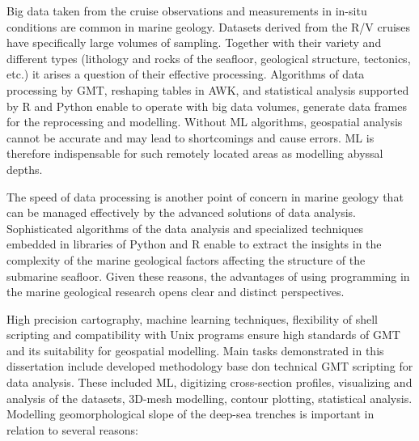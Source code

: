 \documentclass[11pt,a4paper]{report}
\begin{document}
{Big data taken from the cruise observations and measurements in in-situ conditions are common in marine geology.  Datasets derived from the R/V cruises have specifically large volumes of sampling. Together with their variety and different types (lithology and rocks of the seafloor, geological structure, tectonics, etc.) it arises a question of their effective processing. Algorithms of data processing by \ac{GMT}, reshaping tables in AWK, and statistical analysis supported by R and Python enable to operate with big data volumes, generate data frames for the reprocessing and modelling. Without \ac{ML} algorithms, geospatial analysis cannot be accurate and may lead to shortcomings and cause errors. \ac{ML} is therefore indispensable for such remotely located areas as modelling abyssal depths. 

The speed of data processing is another point of concern in marine geology that can be managed effectively by the advanced solutions of data analysis. Sophisticated algorithms of the data analysis and specialized techniques embedded in libraries of Python and R enable to extract the insights in the complexity of the marine geological factors affecting the structure of the submarine seafloor. Given these reasons, the advantages of using programming in the marine geological research opens clear and distinct perspectives. 

High precision cartography, machine learning techniques, flexibility of shell scripting and compatibility with Unix programs ensure high standards of \ac{GMT} and its suitability for geospatial modelling. Main tasks demonstrated in this dissertation include developed methodology base don technical \ac{GMT} scripting for data analysis. These included \ac{ML}, digitizing cross-section profiles, visualizing and analysis of the datasets, 3D-mesh modelling, contour plotting, statistical analysis. Modelling geomorphological slope of the deep-sea trenches is important in relation to several reasons: 

}
\end{document}
